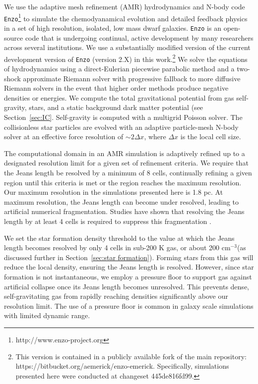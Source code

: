 \documentclass[twocolumn]{aastex61}
\newcommand{\ccunit}{cm$^{-3}$}
\begin{document}
We use the adaptive mesh refinement (AMR) hydrodynamics and N-body code \texttt{Enzo}\footnote{http://www.enzo-project.org} to simulate the chemodyanamical evolution and detailed feedback physics in a set of high resolution, isolated, low mass dwarf galaxies. \texttt{Enzo} is an open-source code that is undergoing continual, active development by many researchers across several institutions. We use a substantially modified version of the current development version of \texttt{Enzo} (version 2.X) in this work.\footnote{This version is contained in a publicly available fork of the main repository: https://bitbucket.org/aemerick/enzo-emerick. Specifically, simulations presented here were conducted at changeset 445de816fd99.} We solve the equations of hydrodynamics using a direct-Eulerian piecewise parabolic method \citep{ColellaWoodward1984, Bryan1995} and a two-shock approximate Riemann solver with progressive fallback to more diffusive Riemann solvers in the event that higher order methods produce negative densities or energies. We compute the total gravitational potential from gas self-gravity, stars, and a static background dark matter potential (see Section~\ref{sec:IC}. Self-gravity is computed with a multigrid Poisson solver. The collisionless star particles are evolved with an adaptive particle-mesh N-body solver at an effective force resolution of $\sim 2 \Delta x$, where $\Delta x$ is the local cell size. 

The computational domain in an AMR simulation is adaptively refined up to a designated resolution limit for a given set of refinement criteria. We require that the Jeans length be resolved by a minimum of 8 cells, continually refining a given region until this criteria is met or the region reaches the maximum resolution. Our maximum resolution in the simulations presented here is 1.8 pc. At maximum resolution, the Jeans length can become under resolved, leading to artificial numerical fragmentation. Studies have shown that resolving the Jeans length by at least 4 cells is required to suppress this fragmentation \citep{Truelove1997}.

We set the star formation density threshold to the value at which the Jeans length becomes resolved by only 4 cells in sub-200 K gas, or about 200 \ccunit (as discussed further in Section~\ref{sec:star formation}). Forming stars from this gas will reduce the local density, ensuring the Jeans length is resolved. However, since star formation is not instantaneous, we employ a pressure floor to support gas against artificial collapse once its Jeans length becomes unresolved. This prevents dense, self-gravitating gas from rapidly reaching densities significantly above our resolution limit. The use of a pressure floor is common in galaxy scale simulations with limited dynamic range. %
\end{document}
